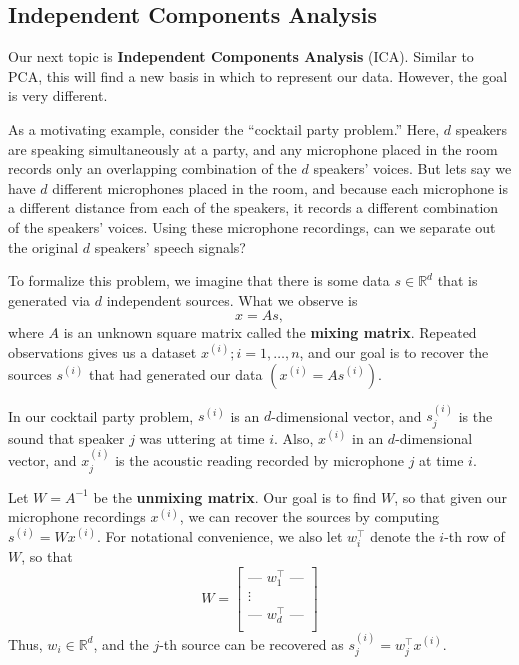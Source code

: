 \titlespacing*{\part}{0pt}{-20pt}{30pt} %
\titlespacing*{\chapter}{0pt}{-10pt}{30pt}

\begin{fullwidth}    
\part{Independent Components Analysis}
\label{part:ica}
\end{fullwidth}


Our next topic is \textbf{Independent Components Analysis} (ICA). Similar to PCA,
this will find a new basis in which to represent our data. However, the goal
is very different.

As a motivating example, consider the ``cocktail party problem.'' Here, $d$
speakers are speaking simultaneously at a party, and any microphone placed
in the room records only an overlapping combination of the $d$ speakers' voices.
But lets say we have $d$ different microphones placed in the room, and because
each microphone is a different distance from each of the speakers, it records a
different combination of the speakers' voices. Using these microphone recordings,
can we separate out the original $d$ speakers' speech signals?

To formalize this problem, we imagine that there is some data $s \in \mathbb R^d$
that is generated via $d$ independent sources. What we observe is
\[
x = As,
\]
where $A$ is an unknown square matrix called the \textbf{mixing matrix}. Repeated
observations gives us a dataset ${x^{(i)}; i = 1,\ldots,n}$, and our goal is to recover
the sources $s^{(i)}$ that had generated our data $(x^{(i)} = As^{(i)})$.

In our cocktail party problem, $s^{(i)}$ is an $d$-dimensional vector, and $s^{(i)}_j$
is the sound that speaker $j$ was uttering at time $i$. Also, $x^{(i)}$ in an $d$-dimensional
vector, and $x^{(i)}_j$ is the acoustic reading recorded by microphone $j$ at time $i$.

Let $W = A^{-1}$ be the \textbf{unmixing matrix}. Our goal is to find $W$, so
that given our microphone recordings $x^{(i)}$, we can recover the sources by
computing $s^{(i)} = Wx^{(i)}$. For notational convenience, we also let $w^\top_i$
denote
the $i$-th row of $W$, so that
\[
W = \begin{bmatrix}
    \text{--- } w_1^\top \text{ ---}\\
    \vdots\\
    \text{--- } w_d^\top \text{ ---}\\
\end{bmatrix}
\]
Thus, $w_i \in \mathbb R^d$, and the $j$-th source can be recovered as $s^{(i)}_j = w^\top_j x^{(i)}$.

